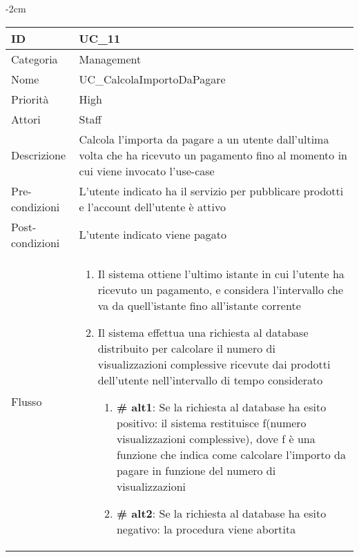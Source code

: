 \begin{center}
\begin{table}[bp]
    \centering
    \addtolength{\leftskip} {-2cm}
\begin{tabular}{ |p{2.6cm}|p{13cm}|  }
\hline
ID & UC\_11 \\\hline
Categoria & Management\\\hline
Nome & UC\_CalcolaImportoDaPagare\\\hline
Priorità & High \\\hline
Attori &  Staff \\\hline
Descrizione & Calcola l'importa da pagare a un utente dall'ultima volta che ha ricevuto un pagamento fino al momento in cui viene invocato l'use-case\\\hline
Pre-condizioni &  L'utente indicato ha il servizio per pubblicare prodotti e l'account dell'utente è attivo\\\hline
Post-condizioni &  L'utente indicato viene pagato\\\hline
Flusso &  	
		\begin{enumerate}
		\item Il sistema ottiene l'ultimo istante in cui l'utente ha ricevuto un pagamento, e considera l'intervallo che va da quell'istante fino all'istante corrente	
		\item Il sistema effettua una richiesta al database distribuito per calcolare il numero di visualizzazioni complessive ricevute dai prodotti dell'utente nell'intervallo di tempo considerato
		\begin{enumerate}[  ]
			\item \textbf{\# alt1}: Se la richiesta al database ha esito positivo: il sistema restituisce f(numero visualizzazioni complessive), dove f è una funzione che indica come calcolare l'importo da pagare in funzione del numero di visualizzazioni
			\item \textbf{\# alt2}: Se la richiesta al database ha esito negativo: la procedura viene abortita
		\end{enumerate}
		\end{enumerate}\\\hline
\end{tabular}
\label{table_use_case:11}\newline
\end{table}


\end{center}
